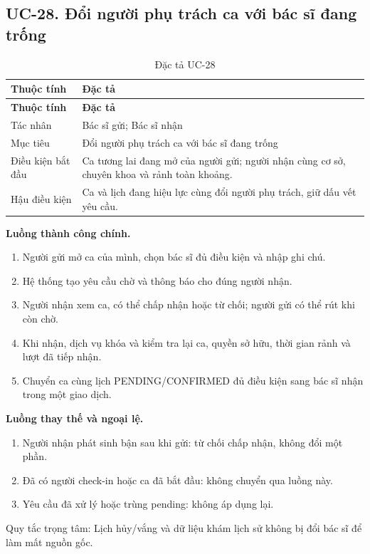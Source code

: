 \clearpage

\subsection{UC-28.\allowbreak{} Đổi người phụ trách ca với bác sĩ đang trống}
\label{uc:28}

{\small\setlength{\tabcolsep}{3pt}\renewcommand{\arraystretch}{1.12}
\begin{longtable}{@{}L{\textwidth-1.32pt\relax} L{\textwidth-4.68pt\relax}@{}}
\caption{Đặc tả UC-28}\\
\toprule
\textbf{Thuộc tính} & \textbf{Đặc tả}\\\midrule
\endfirsthead
\toprule
\textbf{Thuộc tính} & \textbf{Đặc tả}\\\midrule
\endhead
\bottomrule\endlastfoot
Tác nhân & Bác sĩ gửi; Bác sĩ nhận\\[3pt]
Mục tiêu & Đổi người phụ trách ca với bác sĩ đang trống\\[3pt]
Điều kiện bắt đầu & Ca tương lai đang mở của người gửi; người nhận cùng cơ sở, chuyên khoa và rảnh toàn khoảng.\allowbreak{}\\[3pt]
Hậu điều kiện & Ca và lịch đang hiệu lực cùng đổi người phụ trách, giữ dấu vết yêu cầu.\allowbreak{}\\[3pt]
\end{longtable}}
\noindent\textbf{Luồng thành công chính.}
\begin{enumerate}
\item Người gửi mở ca của mình, chọn bác sĩ đủ điều kiện và nhập ghi chú.\allowbreak{}
\item Hệ thống tạo yêu cầu chờ và thông báo cho đúng người nhận.\allowbreak{}
\item Người nhận xem ca, có thể chấp nhận hoặc từ chối; người gửi có thể rút khi còn chờ.\allowbreak{}
\item Khi nhận, dịch vụ khóa và kiểm tra lại ca, quyền sở hữu, thời gian rảnh và lượt đã tiếp nhận.\allowbreak{}
\item Chuyển ca cùng lịch PENDING/\allowbreak{}CONFIRMED đủ điều kiện sang bác sĩ nhận trong một giao dịch.\allowbreak{}
\end{enumerate}
\noindent\textbf{Luồng thay thế và ngoại lệ.}
\begin{enumerate}
\item Người nhận phát sinh bận sau khi gửi:\allowbreak{} từ chối chấp nhận, không đổi một phần.\allowbreak{}
\item Đã có người check-in hoặc ca đã bắt đầu:\allowbreak{} không chuyển qua luồng này.\allowbreak{}
\item Yêu cầu đã xử lý hoặc trùng pending:\allowbreak{} không áp dụng lại.\allowbreak{}
\end{enumerate}
Quy tắc trọng tâm:\allowbreak{} Lịch hủy/\allowbreak{}vắng và dữ liệu khám lịch sử không bị đổi bác sĩ để làm mất nguồn gốc.\allowbreak{}

